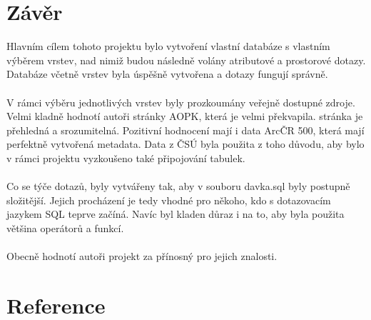 \documentclass[a4paper, 12pt]{article}
\begin{document}
\clearpage
\section{Závěr}
Hlavním cílem tohoto projektu bylo vytvoření vlastní databáze s vlastním výběrem vrstev, nad nimiž budou následně volány atributové a prostorové dotazy. Databáze včetně vrstev byla úspěšně vytvořena a dotazy fungují správně. \\
\\
V rámci výběru jednotlivých vrstev byly prozkoumány veřejně dostupné zdroje. Velmi kladně hodnotí autoři stránky AOPK, která je velmi překvapila. stránka je přehledná a srozumitelná. Pozitivní hodnocení mají i data ArcČR 500, která mají perfektně vytvořená metadata. Data z ČSÚ byla použita z toho důvodu, aby bylo v rámci projektu vyzkoušeno také připojování tabulek. \\
\\
Co se týče dotazů, byly vytvářeny tak, aby v souboru davka.sql byly postupně složitější. Jejich procházení je tedy vhodné pro někoho, kdo s dotazovacím jazykem SQL teprve začíná. Navíc byl kladen důraz i na to, aby byla použita většina operátorů a funkcí. \\
\\
Obecně hodnotí autoři projekt za přínosný pro jejich znalosti. 




\clearpage
\section{Reference}
\end{document}
